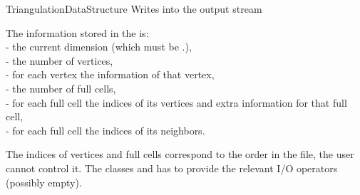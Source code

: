 \begin{ccRefConcept}{TriangulationDataStructure}
{Writes  into the output stream }

The information stored in the  is:
\\- the current dimension (which must be \ccc{<=}\ccVar.), 
\\- the number of vertices,
\\- for each vertex the information of that vertex,
\\- the number of full cells, 
\\- for each full cell the indices of its vertices and extra information for that full cell,
\\- for each full cell the indices of its neighbors.

The indices of vertices and full cells correspond to the order in the
file, the user cannot control it.
The classes  and
 has to provide the relevant I/O operators
(possibly empty).


\ccSeeAlso

\\

\end{ccRefConcept}
